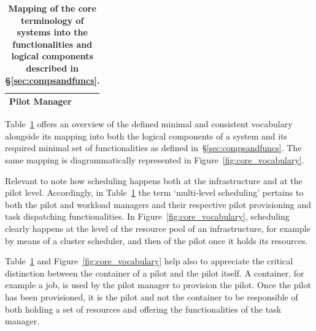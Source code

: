 \documentclass{sig-alternate}
\begin{document}
\begin{table}
\begin{tabular}{|p{4cm}|p{3.2cm}|p{3.2cm}|}
      \textcolor{lcomp}{Pilot Manager} \\
  \hline
 \end{tabular}
 \caption{\textbf{Mapping of the core terminology of \pilot systems into the
     functionalities and logical components described in
     \S\ref{sec:compsandfuncs}.}
     }
 \label{table:terminology}
\end{table}

Table~\ref{table:terminology} offers an overview of the defined minimal and
consistent vocabulary alongside its mapping into both the logical components of
a \pilot system and its required minimal set of functionalities as defined
in~\S\ref{sec:compsandfuncs}. The same mapping is diagrammatically represented
in Figure~\ref{fig:core_vocabulary}.

Relevant to note how scheduling happens both at the infrastructure and at the
pilot level. Accordingly, in Table~\ref{table:terminology} the term
`multi-level scheduling' pertains to both the pilot and workload managers and
their respective pilot provisioning and task dispatching functionalities. In
Figure~\ref{fig:core_vocabulary}, scheduling clearly happens at the level of
the resource pool of an infrastructure, for example by means of a cluster
scheduler, and then of the pilot once it holds its resources.

Table~\ref{table:terminology} and  Figure~\ref{fig:core_vocabulary} help also
to appreciate the critical distinction between the container of a pilot and the
pilot itself. A container, for example a job, is used by the pilot manager to
provision the pilot. Once the pilot has been provisioned, it is the pilot and
not the container to be responsible of both holding a set of resources and
offering the functionalities of the task manager.
\end{document}
